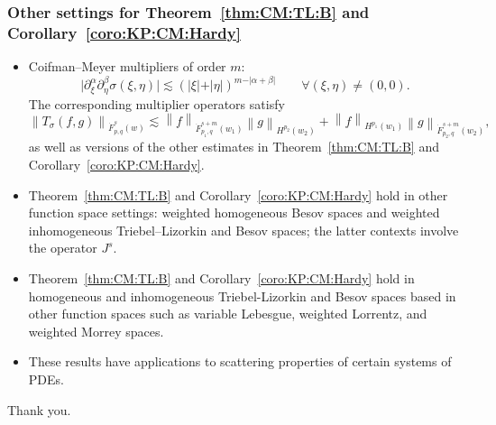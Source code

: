 \documentclass[xcolor=dvipsnames]{beamer}
\newcommand{\abs}[1]{\vert #1 \vert}
\newcommand{\norm}[2]{{\left\| #1 \right\|}_{#2}}
\newcommand{\tlw}[4]{\dot F_{#1,#3}^{#2}(#4)} %
\begin{document}
\begin{frame}\frametitle{Other settings for Theorem~\ref{thm:CM:TL:B} and Corollary~\ref{coro:KP:CM:Hardy}}

\begin{itemize}
\item Coifman--Meyer multipliers of order $m:$
\begin{equation*}
\abs{\partial_\xi^\alpha\partial_\eta^\beta\sigma(\xi,\eta)}\lesssim (\abs{\xi}+\abs{\eta})^{m-\abs{\alpha+\beta}} \quad \quad \forall (\xi,\eta)\neq(0,0).
\end{equation*}
The corresponding multiplier operators satisfy
\begin{equation*}
\norm{T_\sigma(f,g)}{\tlw{p}{s}{q}{w}} \lesssim \norm{f}{\tlw{p_1}{s+m}{q}{w_1} } \norm{g}{H^{p_2}(w_2)} +  \norm{f}{H^{p_1}(w_1)}   \norm{g}{\tlw{p_2}{s+m}{q}{w_2} },
\end{equation*}
as well as versions of the other estimates in Theorem~\ref{thm:CM:TL:B} and Corollary~\ref{coro:KP:CM:Hardy}.

\bigskip

\item Theorem~\ref{thm:CM:TL:B} and Corollary~\ref{coro:KP:CM:Hardy} hold in other function space settings: weighted homogeneous Besov spaces and weighted inhomogeneous Triebel--Lizorkin and Besov spaces; the latter contexts involve the operator $J^s.$

\bigskip

\item Theorem~\ref{thm:CM:TL:B} and Corollary~\ref{coro:KP:CM:Hardy} hold in homogeneous and inhomogeneous Triebel-Lizorkin and Besov spaces based in other function spaces such as variable Lebesgue, weighted Lorrentz, and weighted Morrey spaces. 

\bigskip

\item These results have applications to scattering properties of certain systems of PDEs. 

\end{itemize}
\end{frame}

\begin{frame}
Thank you.
\end{frame}
\end{document}
